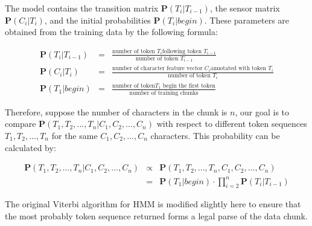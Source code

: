 The model contains the transition matrix $\mathbf{P}(T_i|T_{i-1})$,
the sensor matrix $\mathbf{P}(C_i|T_i)$, and the initial
probabilities $\mathbf{P}(T_i|begin)$. These parameters are obtained
from the training data by the following formula:

\begin{eqnarray*}
\mathbf{P}(T_i|T_{i-1}) & = & \frac{\textrm{number of token }T_i\textrm{
following token }T_{i-1}}{\textrm{number of token }T_{i-1}} \label{eqn:1}\\
\mathbf{P}(C_i|T_i) & = & \frac{\textrm{number of character feature
vector }C_i\textrm{
annotated with token }T_i}{\textrm{number of token }T_i} \\
\mathbf{P}(T_1|begin) & = & \frac{\textrm{number of token
}T_1\textrm{ begin the first token}}{\textrm{number of training
chunks}} \label{eqn:2}
\end{eqnarray*}

Therefore, suppose the number of characters in the chunk is $n$, our
goal is to compare $\mathbf{P}(T_1, T_2, ..., T_n|C_1, C_2, ..., C_n)$
with respect to different token sequences $T_1, T_2, ..., T_n$ for the
same $C_1, C_2, ..., C_n$ characters. This probability can be
calculated by:

\begin{eqnarray*}
\mathbf{P}(T_1, T_2, ..., T_n|C_1, C_2, ..., C_n) & \propto & \mathbf{P}(T_1, T_2, ..., T_n, C_1, C_2, ..., C_n)\\
& = & \mathbf{P}(T_1|begin) \cdot
\prod_{i=2}^{n}{\mathbf{P}(T_i|T_{i-1})}
\end{eqnarray*}


The original Viterbi algorithm for HMM is modified slightly here 
to ensure that the most probably token sequence returned forms a legal
parse of the data chunk. 

